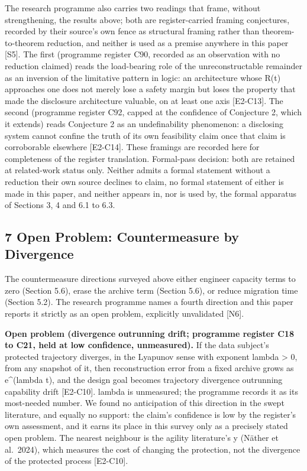\documentclass[
  11pt,
]{article}
\begin{document}
The research programme also carries two readings that frame, without
strengthening, the results above; both are register-carried framing
conjectures, recorded by their source's own fence as structural framing
rather than theorem-to-theorem reduction, and neither is used as a
premise anywhere in this paper {[}S5{]}. The first (programme register
C90, recorded as an observation with no reduction claimed) reads the
load-bearing role of the unreconstructable remainder as an inversion of
the limitative pattern in logic: an architecture whose R(t) approaches
one does not merely lose a safety margin but loses the property that
made the disclosure architecture valuable, on at least one axis
{[}E2-C13{]}. The second (programme register C92, capped at the
confidence of Conjecture 2, which it extends) reads Conjecture 2 as an
undefinability phenomenon: a disclosing system cannot confine the truth
of its own feasibility claim once that claim is corroborable elsewhere
{[}E2-C14{]}. These framings are recorded here for completeness of the
register translation. Formal-pass decision: both are retained at
related-work status only. Neither admits a formal statement without a
reduction their own source declines to claim, no formal statement of
either is made in this paper, and neither appears in, nor is used by,
the formal apparatus of Sections 3, 4 and 6.1 to 6.3.

\subsection{7 Open Problem: Countermeasure by
Divergence}\label{open-problem-countermeasure-by-divergence}

The countermeasure directions surveyed above either engineer capacity
terms to zero (Section 5.6), erase the archive term (Section 5.6), or
reduce migration time (Section 5.2). The research programme names a
fourth direction and this paper reports it strictly as an open problem,
explicitly unvalidated {[}N6{]}.

\textbf{Open problem (divergence outrunning drift; programme register
C18 to C21, held at low confidence, unmeasured).} If the data subject's
protected trajectory diverges, in the Lyapunov sense with exponent
lambda \textgreater{} 0, from any snapshot of it, then reconstruction
error from a fixed archive grows as e\^{}(lambda t), and the design goal
becomes trajectory divergence outrunning capability drift {[}E2-C10{]}.
lambda is unmeasured; the programme records it as its most-needed
number. We found no anticipation of this direction in the swept
literature, and equally no support: the claim's confidence is low by the
register's own assessment, and it earns its place in this survey only as
a precisely stated open problem. The nearest neighbour is the agility
literature's y (Näther et al.~2024), which measures the cost of changing
the protection, not the divergence of the protected process
{[}E2-C10{]}.
\end{document}
